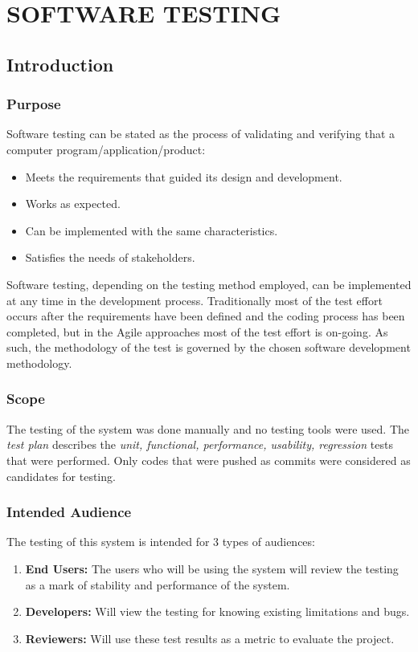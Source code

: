 \chapter {SOFTWARE TESTING}
\section{Introduction}
\subsection{Purpose}
Software testing can be stated as the process of validating and verifying that a computer program/application/product:
\begin{itemize}
\item Meets the requirements that guided its design and development.
\item Works as expected.
\item Can be implemented with the same characteristics.
\item Satisfies the needs of stakeholders.
\end{itemize}

Software testing, depending on the testing method employed, can be implemented at any time in the development process. Traditionally most of the test effort occurs after the requirements have been defined and the coding process has been completed, but in the Agile approaches most of the test effort is on-going. As such, the methodology of the test is governed by the chosen software development methodology.

\subsection{Scope}
The testing of the system was done manually and no testing tools were used. The \emph{test plan} describes the \emph{unit, functional, performance, usability, regression} tests that were performed. Only codes that were pushed as commits were considered as candidates for testing.

\subsection{Intended Audience}
The testing of this system is intended for 3 types of audiences:
\begin{enumerate}
\item \textbf{End Users:} The users who will be using the system will review the testing as a mark of stability and performance of the system.
\item \textbf{Developers:} Will view the testing for knowing existing limitations and bugs.
\item \textbf{Reviewers:} Will use these test results as a metric to evaluate the project.
\end{enumerate}


